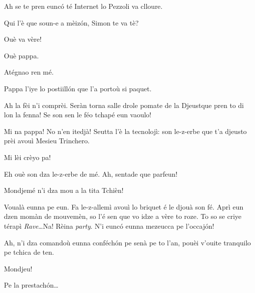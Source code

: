 \begin{drama}
\Mariettospeaks Ah se te pren eunc\'o té Internet lo Pezzoli va clloure.


\Cienspeaks Qui l'è que soun-e a mèiz\'on, Simon te va tè?

\Mariettospeaks Ouè va vère!

\Simonspeaks Ouè pappa. 

\Cienspeaks Atégnao ren mé.


\Simonspeaks Pappa l’iye lo postiill\'on que l’a portoù si paquet.

\Cienspeaks Ah la fèi n'i comprèi. Seràn torna salle drole pomate de la \og Djeust\fg que pren to di lon la fenna! Se son sen le féo tchapé eun vaoulo!

\Simonspeaks Mi na pappa! No n'en itedjà! Seutta l'è la tecnolojì: son le-z-erbe que t’a djeusto prèi avouì Mesieu Trinchero.

\Cienspeaks Mi lèi crèyo pa!


\Trincherospeaks Eh ouè son dza le-z-erbe de mé. Ah, sentade que parfeun!


\Mariettospeaks Mondjemé n’i dza mou a la tita Tchièn!


\Trincherospeaks Voualà eunna pe eun. Fa le-z-allemì avouì lo briquet é le djouà son fé. Aprì eun dzen momàn de mouvemèn, so l’é sen que vo idze a vère to roze. To so se criye térapì \textit{Rave}\ldots Na! Rèina \textit{party}. N’i eunc\'o eunna mezeucca pe l’occaj\'on!
\newpage
{}


\Trincherospeaks Ah, n’i dza comandoù eunna conféch\'on pe senà pe to l’an, pouèi v'ouite tranquilo pe tchica de ten. 

\Cienspeaks Mondjeu!

\Trincherospeaks Pe la prestach\'on\ldots


\end{drama}
